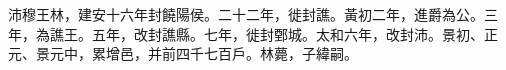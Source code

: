 \begin{pinyinscope}
 
 
 沛穆王林，建安十六年封饒陽侯。二十二年，徙封譙。黃初二年，進爵為公。三年，為譙王。五年，改封譙縣。七年，徙封鄄城。太和六年，改封沛。景初、正元、景元中，累增邑，并前四千七百戶。林薨，子緯嗣。
 
 
 
 
\end{pinyinscope}